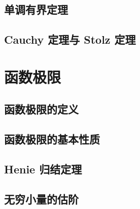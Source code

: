 \documentclass[main]{subfiles}
\begin{document}
\subsection{单调有界定理}

\subsection{Cauchy 定理与 Stolz 定理}
\section{函数极限}
\subsection{函数极限的定义}
\subsection{函数极限的基本性质}
\subsection{Henie 归结定理}
\subsection{无穷小量的估阶}
\end{document}
